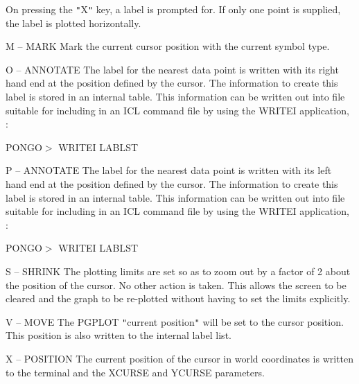 \begin{sloppypar}
{{{         
            On pressing the {\tt "}X{\tt "} key, a label is prompted for. If only
            one point is supplied, the label is plotted horizontally.

         \sstitem
            M -- MARK
            Mark the current cursor position with the current symbol
            type.

         \sstitem
            O -- ANNOTATE
            The label for the nearest data point is written with its
            right hand end at the position defined by the cursor.  The
            information to create this label is stored in an internal
            table. This information can be written out into file
            suitable for including in an ICL command file by using the
            WRITEI application, \eg:

               PONGO$>$ WRITEI LABLST

         \sstitem
            P -- ANNOTATE
            The label for the nearest data point is written with its
            left hand end at the position defined by the cursor.  The
            information to create this label is stored in an internal
            table. This information can be written out into file
            suitable for including in an ICL command file by using the
            WRITEI application, \eg:

               PONGO$>$ WRITEI LABLST

         \sstitem
            S -- SHRINK
            The plotting limits are set so as to zoom out by a factor
            of 2 about the position of the cursor. No other action is
            taken. This allows the screen to be cleared and the graph
            to be re-plotted without having to set the limits
            explicitly.

         \sstitem
            V -- MOVE
            The PGPLOT {\tt "}current position{\tt "} will be set to the cursor
            position. This position is also written to the internal
            label list.

         \sstitem
            X -- POSITION
            The current position of the cursor in world coordinates is
            written to the terminal and the XCURSE and YCURSE
            parameters.

}}}
\end{sloppypar}

